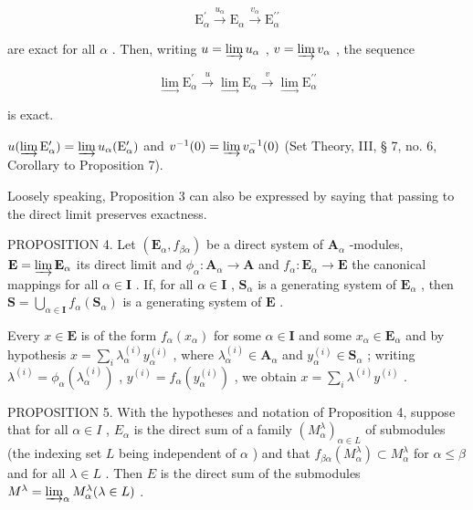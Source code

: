 \[
\mathrm{E} _ {\alpha} ^ {\prime} \xrightarrow {u _ {\alpha}} \mathrm{E} _ {\alpha} \xrightarrow {v _ {\alpha}} \mathrm{E} _ {\alpha} ^ {\prime \prime}
\]

are exact for all \(\alpha\) . Then, writing \(u = \varinjlim u_{\alpha}\) , \(v = \varinjlim v_{\alpha}\) , the sequence

\[
\lim _ {\longrightarrow} \mathrm{E} _ {\alpha} ^ {\prime} \xrightarrow {u} \lim _ {\longrightarrow} \mathrm{E} _ {\alpha} \xrightarrow {v} \lim _ {\longrightarrow} \mathrm{E} _ {\alpha} ^ {\prime \prime}
\]

is exact.

\(u(\varinjlim \mathrm{E}_{\alpha}^{\prime}) = \varinjlim u_{\alpha}(\mathrm{E}_{\alpha}^{\prime})\) and \(v^{-1}(0) = \varinjlim v_{\alpha}^{-1}(0)\) (Set Theory, III, § 7, no. 6, Corollary to Proposition 7).

Loosely speaking, Proposition 3 can also be expressed by saying that passing to the direct limit preserves exactness.

PROPOSITION 4. Let \((\mathbf{E}_{\alpha}, f_{\beta \alpha})\) be a direct system of \(\mathbf{A}_{\alpha}\) -modules, \(\mathbf{E} = \varinjlim \mathbf{E}_{\alpha}\) its direct limit and \(\phi_{\alpha}: \mathbf{A}_{\alpha} \to \mathbf{A}\) and \(f_{\alpha}: \mathbf{E}_{\alpha} \to \mathbf{E}\) the canonical mappings for all \(\alpha \in \mathbf{I}\) . If, for all \(\alpha \in \mathbf{I}\) , \(\mathbf{S}_{\alpha}\) is a generating system of \(\mathbf{E}_{\alpha}\) , then \(\mathbf{S} = \bigcup_{\alpha \in \mathbf{I}} f_{\alpha}(\mathbf{S}_{\alpha})\) is a generating system of \(\mathbf{E}\) .

Every \(x \in \mathbf{E}\) is of the form \(f_{\alpha}(x_{\alpha})\) for some \(\alpha \in \mathbf{I}\) and some \(x_{\alpha} \in \mathbf{E}_{\alpha}\) and by hypothesis \(x = \sum_{i} \lambda_{\alpha}^{(i)} y_{\alpha}^{(i)}\) , where \(\lambda_{\alpha}^{(i)} \in \mathbf{A}_{\alpha}\) and \(y_{\alpha}^{(i)} \in \mathbf{S}_{\alpha}\) ; writing \(\lambda^{(i)} = \phi_{\alpha}(\lambda_{\alpha}^{(i)})\) , \(y^{(i)} = f_{\alpha}(y_{\alpha}^{(i)})\) , we obtain \(x = \sum_{i} \lambda^{(i)} y^{(i)}\) .

PROPOSITION 5. With the hypotheses and notation of Proposition 4, suppose that for all \(\alpha \in I\) , \(E_{\alpha}\) is the direct sum of a family \((M_{\alpha}^{\lambda})_{\alpha \in L}\) of submodules (the indexing set \(L\) being independent of \(\alpha\) ) and that \(f_{\beta \alpha}(M_{\alpha}^{\lambda}) \subset M_{\alpha}^{\lambda}\) for \(\alpha \leqslant \beta\) and for all \(\lambda \in L\) . Then \(E\) is the direct sum of the submodules \(M^{\lambda} = \varinjlim_{\alpha} M_{\alpha}^{\lambda} (\lambda \in L)\) .

